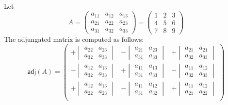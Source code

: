 \documentclass[a4paper,12pt]{article}
\begin{document}
Let
\begin{equation}
A=
\begin{pmatrix}
a_{11}&a_{12}&a_{13}\\
a_{21}&a_{22}&a_{23}\\
a_{31}&a_{32}&a_{33}
\end{pmatrix}
=  
\begin{pmatrix}
1&2&3\\
4&5&6\\
7&8&9
\end{pmatrix}
\end{equation}
The adjungated matrix is computed as follows:
\begin{equation}
\mathsf{adj}(A)=
\begin{pmatrix}
	+\begin{vmatrix}a_{22}&a_{23}\\a_{32}&a_{33}\end{vmatrix}&
	-\begin{vmatrix}a_{21}&a_{23}\\a_{31}&a_{33}\end{vmatrix}&
	+\begin{vmatrix}a_{21}&a_{21}\\a_{32}&a_{33}\end{vmatrix}\\[2em]
	-\begin{vmatrix}a_{12}&a_{13}\\a_{32}&a_{33}\end{vmatrix}&
	+\begin{vmatrix}a_{11}&a_{13}\\a_{31}&a_{33}\end{vmatrix}&
	-\begin{vmatrix}a_{11}&a_{12}\\a_{32}&a_{33}\end{vmatrix}\\[2em]
	+\begin{vmatrix}a_{12}&a_{13}\\a_{22}&a_{23}\end{vmatrix}&
	-\begin{vmatrix}a_{11}&a_{12}\\a_{31}&a_{32}\end{vmatrix}&
	+\begin{vmatrix}a_{11}&a_{12}\\a_{21}&a_{22}\end{vmatrix}\\
\end{pmatrix}
\end{equation}
\end{document}
